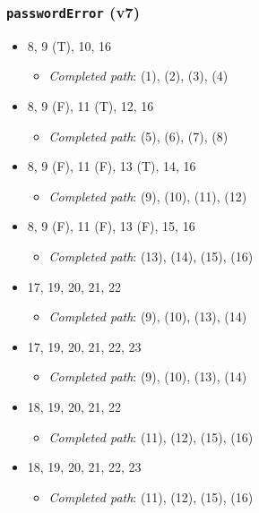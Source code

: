 \documentclass{article}
\newcommand{\completedpath}{\textit{Completed path}}
\begin{document}
\subsubsection*{\texttt{passwordError} (v7)}

\begin{itemize}
    \item 8, 9 (T), 10, 16
    \begin{itemize}
        \item \completedpath: (1), (2), (3), (4)
    \end{itemize}
    \item 8, 9 (F), 11 (T), 12, 16
    \begin{itemize}
        \item \completedpath: (5), (6), (7), (8)
    \end{itemize}
    \item 8, 9 (F), 11 (F), 13 (T), 14, 16
    \begin{itemize}
        \item \completedpath: (9), (10), (11), (12)
    \end{itemize}
    \item 8, 9 (F), 11 (F), 13 (F), 15, 16
    \begin{itemize}
        \item \completedpath: (13), (14), (15), (16)
    \end{itemize}
    \item 17, 19, 20, 21, 22
    \begin{itemize}
        \item \completedpath: (9), (10), (13), (14)
    \end{itemize}
    \item 17, 19, 20, 21, 22, 23
    \begin{itemize}
        \item \completedpath: (9), (10), (13), (14)
    \end{itemize}
    \item 18, 19, 20, 21, 22
    \begin{itemize}
        \item \completedpath: (11), (12), (15), (16)
    \end{itemize}
    \item 18, 19, 20, 21, 22, 23
    \begin{itemize}
        \item \completedpath: (11), (12), (15), (16)
    \end{itemize}
\end{itemize}
\end{document}
